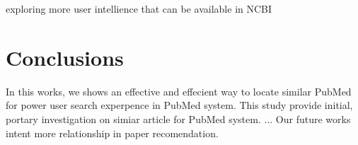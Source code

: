 \documentclass[11pt]{article}
\begin{document}
    exploring more user intellience that can be available in NCBI


    \section{Conclusions}
    In this works, we shows an effective and effecient way to locate similar PubMed for power user search experpence in PubMed system.
    This study provide initial, portary investigation on simiar article for PubMed system.
    ...
    Our future works intent more relationship in paper recomendation.

    
    
\end{document}
